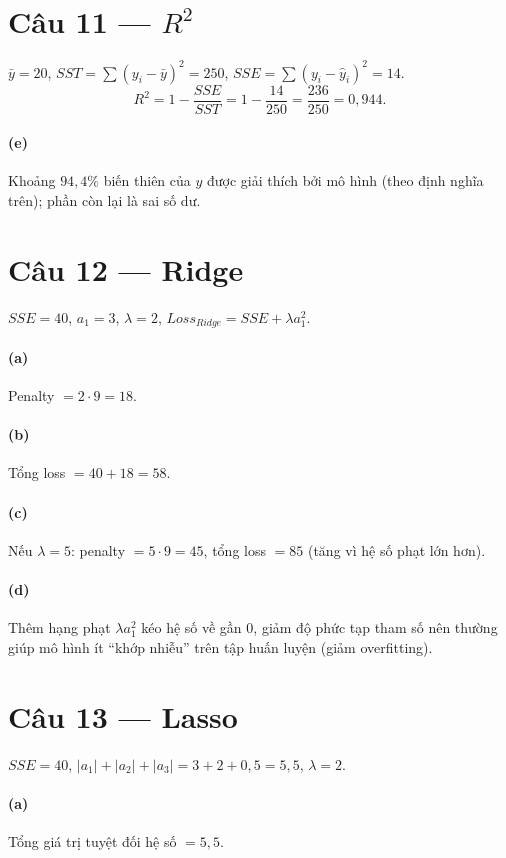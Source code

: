 \section*{Câu 11 --- $R^2$}
$\bar y=20$, $SST=\sum (y_i-\bar y)^2=250$, $SSE=\sum (y_i-\hat y_i)^2=14$.
\[
R^2=1-\frac{SSE}{SST}=1-\frac{14}{250}=\frac{236}{250}=0{,}944.
\]

\paragraph{(e)} Khoảng $94{,}4\%$ biến thiên của $y$ được giải thích bởi mô hình (theo định nghĩa trên); phần còn lại là sai số dư.

\section*{Câu 12 --- Ridge}
$SSE=40$, $a_1=3$, $\lambda=2$, $Loss_{Ridge}=SSE+\lambda a_1^2$.

\paragraph{(a)} Penalty $=2\cdot 9=18$.

\paragraph{(b)} Tổng loss $=40+18=58$.

\paragraph{(c)} Nếu $\lambda=5$: penalty $=5\cdot 9=45$, tổng loss $=85$ (tăng vì hệ số phạt lớn hơn).

\paragraph{(d)} Thêm hạng phạt $\lambda a_1^2$ kéo hệ số về gần $0$, giảm độ phức tạp tham số nên thường giúp mô hình ít ``khớp nhiễu'' trên tập huấn luyện (giảm overfitting).

\section*{Câu 13 --- Lasso}
$SSE=40$, $|a_1|+|a_2|+|a_3|=3+2+0{,}5=5{,}5$, $\lambda=2$.

\paragraph{(a)} Tổng giá trị tuyệt đối hệ số $=5{,}5$.

